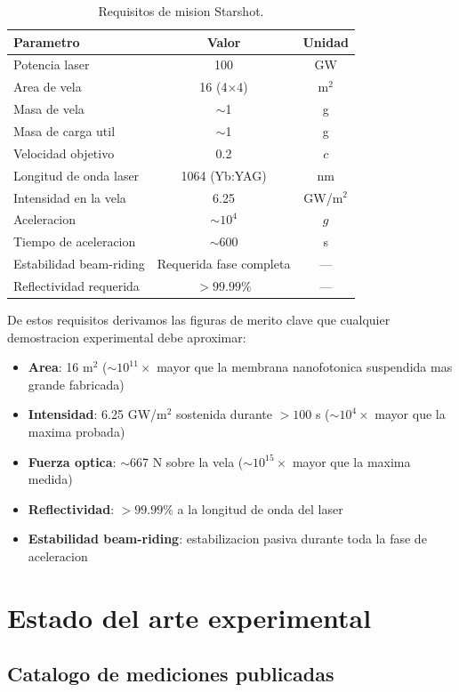 \documentclass[11pt,a4paper,onecolumn]{article}
\begin{document}
\begin{table}[h]
\centering
\caption{Requisitos de mision Starshot.}
\label{tab:req}
\begin{tabular}{lcc}
\hline
\textbf{Parametro} & \textbf{Valor} & \textbf{Unidad} \\
\hline
Potencia laser & 100 & GW \\
Area de vela & 16 (4$\times$4) & m$^2$ \\
Masa de vela & $\sim$1 & g \\
Masa de carga util & $\sim$1 & g \\
Velocidad objetivo & 0.2 & $c$ \\
Longitud de onda laser & 1064 (Yb:YAG) & nm \\
Intensidad en la vela & 6.25 & GW/m$^2$ \\
Aceleracion & $\sim10^4$ & $g$ \\
Tiempo de aceleracion & $\sim$600 & s \\
Estabilidad beam-riding & Requerida fase completa & --- \\
Reflectividad requerida & $>99.99\%$ & --- \\
\hline
\end{tabular}
\end{table}

De estos requisitos derivamos las figuras de merito clave que cualquier demostracion experimental debe aproximar:

\begin{itemize}
  \item \textbf{Area}: 16 m$^2$ ($\sim10^{11}\times$ mayor que la membrana nanofotonica suspendida mas grande fabricada)
  \item \textbf{Intensidad}: 6.25 GW/m$^2$ sostenida durante $>100$ s ($\sim10^4\times$ mayor que la maxima probada)
  \item \textbf{Fuerza optica}: $\sim$667 N sobre la vela ($\sim10^{15}\times$ mayor que la maxima medida)
  \item \textbf{Reflectividad}: $>99.99\%$ a la longitud de onda del laser
  \item \textbf{Estabilidad beam-riding}: estabilizacion pasiva durante toda la fase de aceleracion
\end{itemize}

\section{Estado del arte experimental}

\subsection{Catalogo de mediciones publicadas}
\end{document}
